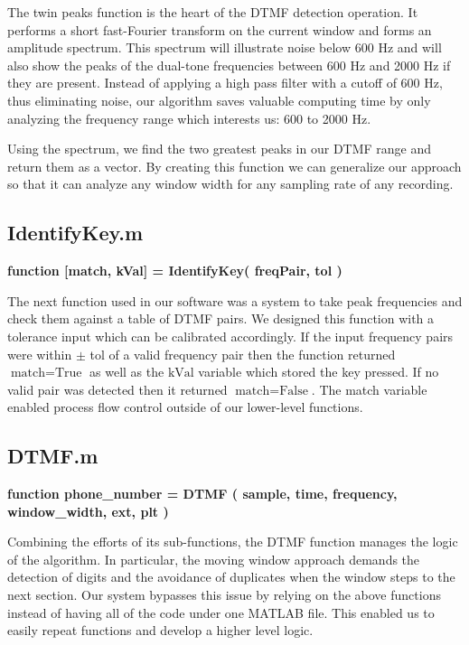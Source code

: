 The twin peaks function is the heart of the DTMF detection operation. It performs a short fast-Fourier transform on the current window and forms an amplitude spectrum. This spectrum will illustrate noise below 600 Hz and will also show the peaks of the dual-tone frequencies between 600 Hz and 2000 Hz if they are present. Instead of applying a high pass filter with a cutoff of 600 Hz, thus eliminating noise, our algorithm saves valuable computing time by only analyzing the frequency range which interests us: 600 to 2000 Hz.

\parSpace

Using the spectrum, we find the two greatest peaks in our DTMF range and return them as a vector. By creating this function we can generalize our approach so that it can analyze any window width for any sampling rate of any recording.


\subsection{IdentifyKey.m}

\vspace{-0.1cm}
\textbf{function [match, kVal] = IdentifyKey( freqPair, tol )}
\vspace{0.3cm}

The next function used in our software was a system to take peak frequencies and check them against a table of DTMF pairs. We designed this function with a tolerance input which can be calibrated accordingly. If the input frequency pairs were within $\pm$ tol of a valid frequency pair then the function returned $\text{match} = \text{True}$ as well as the $\text{kVal}$ variable which stored the key pressed. If no valid pair was detected then it returned $\text{match} = \text{False}$. The match variable enabled process flow control outside of our lower-level functions.


\subsection{DTMF.m}
\label{DTMF}

\vspace{-0.1cm}
\textbf{function phone\_number = DTMF ( sample, time, frequency, window\_width, ext, plt )}
\vspace{-0.1cm}

Combining the efforts of its sub-functions, the DTMF function manages the logic of the algorithm. In particular, the moving window approach demands the detection of digits and the avoidance of duplicates when the window steps to the next section. Our system bypasses this issue by relying on the above functions instead of having all of the code under one MATLAB file. This enabled us to easily repeat functions and develop a higher level logic.

